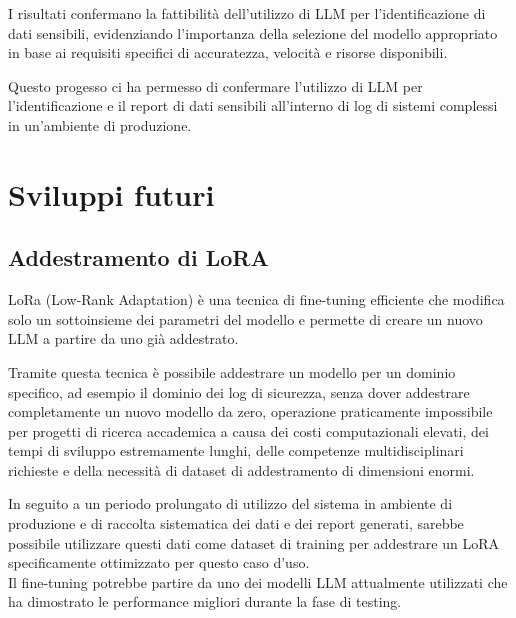 \documentclass[12pt]{report}
\begin{document}
I risultati confermano la fattibilità dell'utilizzo di LLM per l'identificazione di dati sensibili, evidenziando l'importanza della selezione del modello appropriato in base ai requisiti specifici di accuratezza, velocità e risorse disponibili.



%
%



Questo progesso ci ha permesso di confermare l'utilizzo di LLM per l'identificazione e il report di dati sensibili all'interno di log di sistemi complessi in un'ambiente di produzione.

\section{Sviluppi futuri}
\label{sec:sviluppi_futuri}

\subsection{Addestramento di LoRA}
\label{subsec:addestramento_lora}

LoRa (Low-Rank Adaptation) è una tecnica di fine-tuning efficiente che modifica solo un sottoinsieme dei parametri del modello e permette di creare un nuovo LLM a partire da uno già addestrato.

Tramite questa tecnica è possibile addestrare un modello per un dominio specifico, ad esempio il dominio dei log di sicurezza, senza dover addestrare completamente un nuovo modello da zero, operazione praticamente impossibile per progetti di ricerca accademica a causa dei costi computazionali elevati, dei tempi di sviluppo estremamente lunghi, delle competenze multidisciplinari richieste e della necessità di dataset di addestramento di dimensioni enormi.

In seguito a un periodo prolungato di utilizzo del sistema in ambiente di produzione e di raccolta sistematica dei dati e dei report generati, sarebbe possibile utilizzare questi dati come dataset di training per addestrare un LoRA specificamente ottimizzato per questo caso d'uso. \\
Il fine-tuning potrebbe partire da uno dei modelli LLM attualmente utilizzati che ha dimostrato le performance migliori durante la fase di testing.
\end{document}
